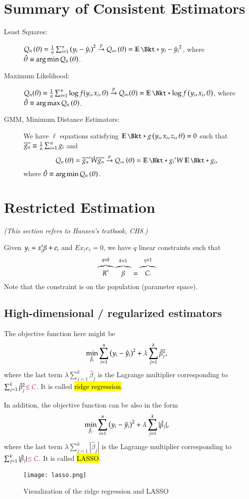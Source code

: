 \documentclass{Theme}
\date{Dec. 1, 2022}
\affil[$\star$]{Department of Economics, National Taiwan University}
\begin{document}
\ujtitle 

\section{Summary of Consistent Estimators}
\begin{description}
  \item[Least Squares:]
    $Q_n\left(\tht\right)=\frn\sumn\left(y_i-\hyi\right)^2\pto Q_\infty\left(\tht\right)=\E{y_i-\hyi}^2$,
    where $\hat{\theta}\equiv \operatorname*{arg\,min} Q_n\left(\theta\right)$.
  \item[Maximum Likelihood:]
    $Q_n(\tht)=\frn\sumn\log f(y_i,x_i,\tht)\pto Q_\infty(\tht)=\E{\log f\left(y_i,x_i,\tht\right)}$,
    where $\hat{\theta}\equiv \operatorname*{arg\,max} Q_n\left(\theta\right)$.
  \item[GMM, Minimum Distance Estimators:]
    We have $\ell$ equations satisfying $\E{g\left(y_i,x_i,z_i,\tht\right)}=0$ such that
    $\overline{g_n}\equiv\frac{1}{n}\sum_{i=1}^n g_i$ and 
    \[
      Q_n\left(\tht\right)=\bgn'\hat{W}\bgn\pto Q_\infty\left(\tht\right)=\E{g_i}'W\E{g_i},
    \]
    where $\hat{\theta}\equiv\operatorname*{arg\,min} Q_n\left(\theta\right)$.
\end{description}

\section{Restricted Estimation}
{\it (This section refers to Hansen's textbook, CH8.)}

Given $y_i=x_i'\beta+e_i$ and $E{x_ie_i}=0$,
we have $q$ linear constraints such that 
\[
  \overbrace{R'}^{q\times k}\overbrace{\beta}^{k\times1}=\overbrace{C.}^{q\times 1}
\]
Note that the constraint is on the population (parameter space).

\subsection{High-dimensional / regularized estimators}
The objective function here might be 
\[
  \min_{\hat{\beta}_i}\sum_{i=1}^n\left(y_i-\hat{y}_i\right)^2+\lambda\sum_{j=1}^k\hat{\beta}^2_j,
\]
where the last term $\lambda\sum_{j=1}^k\hat{\beta}_j$ is the Lagrange 
multiplier corresponding to $\sum_{j=1}^k\hat{\beta}^2_j\hl{\leq C}$. It is 
called \hl{ridge regression}.

In addition, the objective function can be also in the form 
\[
  \min_{\hat{\beta}_i}\sum_{i=1}^n\left(y_i-\hat{y}_i\right)^2+\lambda\sum_{j=1}^k|\hat{\beta}_j|,
\]
where the last term $\lambda\sum_{j=1}^k|\hat{\beta}_j|$ is the Lagrange 
multiplier corresponding to $\sum_{j=1}^k|\hat{\beta}_j|\hl{\leq C}$. It is 
called \hl{LASSO}.
\begin{figure}[h!]
\texttt{[image: lasso.png]}
\caption{Visualization of the ridge regression and LASSO}
\centering
\end{figure}
\end{document}
